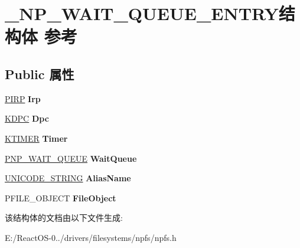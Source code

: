 \hypertarget{struct___n_p___w_a_i_t___q_u_e_u_e___e_n_t_r_y}{}\section{\+\_\+\+N\+P\+\_\+\+W\+A\+I\+T\+\_\+\+Q\+U\+E\+U\+E\+\_\+\+E\+N\+T\+R\+Y结构体 参考}
\label{struct___n_p___w_a_i_t___q_u_e_u_e___e_n_t_r_y}
\subsection*{Public 属性}
\begin{DoxyCompactItemize}
\item 
\mbox{\label{struct___n_p___w_a_i_t___q_u_e_u_e___e_n_t_r_y_aaa02a3b7f331b0bc102b38efe5e616b0}} 
\hyperlink{interfacevoid}{P\+I\+RP} {\bfseries Irp}
\item 
\mbox{\label{struct___n_p___w_a_i_t___q_u_e_u_e___e_n_t_r_y_a1a82fecba9a70343afc35d3f6a4a43a6}} 
\hyperlink{struct___k_d_p_c}{K\+D\+PC} {\bfseries Dpc}
\item 
\mbox{\label{struct___n_p___w_a_i_t___q_u_e_u_e___e_n_t_r_y_afa7d66feba2e3f8cdf3cef13a2b2b609}} 
\hyperlink{struct___k_t_i_m_e_r}{K\+T\+I\+M\+ER} {\bfseries Timer}
\item 
\mbox{\label{struct___n_p___w_a_i_t___q_u_e_u_e___e_n_t_r_y_a704f2f085df66c73013a6110a066afb9}} 
\hyperlink{struct___n_p___w_a_i_t___q_u_e_u_e}{P\+N\+P\+\_\+\+W\+A\+I\+T\+\_\+\+Q\+U\+E\+UE} {\bfseries Wait\+Queue}
\item 
\mbox{\label{struct___n_p___w_a_i_t___q_u_e_u_e___e_n_t_r_y_aa112ac5ce5c7aacc39c79d8f71610fa4}} 
\hyperlink{struct___u_n_i_c_o_d_e___s_t_r_i_n_g}{U\+N\+I\+C\+O\+D\+E\+\_\+\+S\+T\+R\+I\+NG} {\bfseries Alias\+Name}
\item 
\mbox{\label{struct___n_p___w_a_i_t___q_u_e_u_e___e_n_t_r_y_acef525c700c8ea78948df5e4cffdb957}} 
P\+F\+I\+L\+E\+\_\+\+O\+B\+J\+E\+CT {\bfseries File\+Object}
\end{DoxyCompactItemize}


该结构体的文档由以下文件生成\+:\begin{DoxyCompactItemize}
\item 
E\+:/\+React\+O\+S-\/0../drivers/filesystems/npfs/npfs.\+h\end{DoxyCompactItemize}
